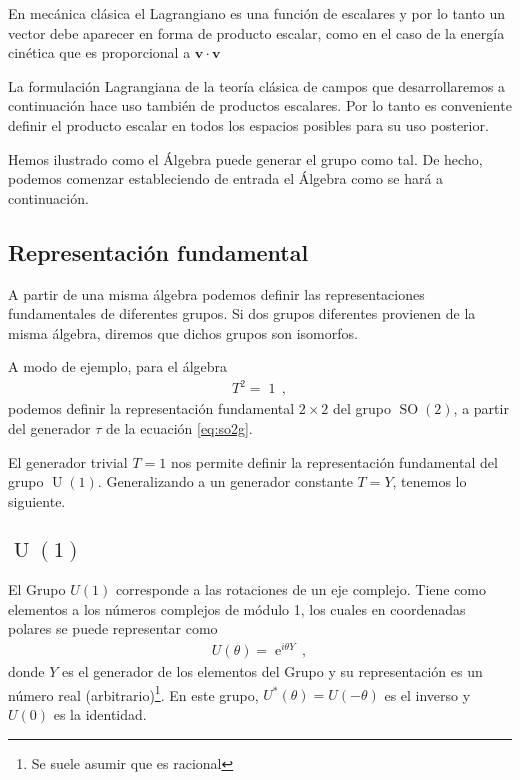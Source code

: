 \begin{frame}
  En mecánica clásica el Lagrangiano es una función de escalares y por lo tanto un vector debe aparecer en forma de producto escalar, como en el caso de la energía cinética que es proporcional a $\boldsymbol{v}\cdot \boldsymbol{v}$
\end{frame}

La formulación Lagrangiana de la teoría clásica de campos que desarrollaremos a continuación hace uso también de productos escalares. Por lo tanto es conveniente definir el producto escalar en todos los espacios posibles para su uso posterior.


Hemos ilustrado como el Álgebra puede generar el grupo como tal. De hecho, podemos comenzar estableciendo de entrada el Álgebra como se hará a continuación.


\subsection{Representación fundamental}
A partir de una misma álgebra podemos definir las representaciones fundamentales de diferentes grupos. Si dos grupos diferentes provienen de la misma álgebra, diremos que dichos grupos son isomorfos.

A modo de ejemplo, para el álgebra
\begin{align}
  T^2=\operatorname{1}\,,
\end{align}
podemos definir la representación fundamental $2\times2$ del grupo $\operatorname{SO}(2)$, a partir del generador $\tau$ de la ecuación \eqref{eq:so2g}. 

El generador trivial $T=1$ nos permite definir la representación fundamental del grupo  $\operatorname{U}(1)$. Generalizando a un generador constante $T=Y$, tenemos lo siguiente.

\subsection{$\operatorname{U}(1)$}
 El Grupo $U(1)$ corresponde a las rotaciones de un eje complejo. Tiene como elementos a los números complejos de módulo 1, los cuales en coordenadas polares se puede representar como
\begin{align}
  U(\theta)=\operatorname{e}^{i \theta Y}\,,
\end{align}
donde $Y$ es el generador de los elementos del Grupo y su representación es un número real (arbitrario)\footnote{Se suele asumir que es racional}.  En este grupo, $U^{*}(\theta)=U(-\theta)$ es el inverso y $U(0)$ es la identidad.

